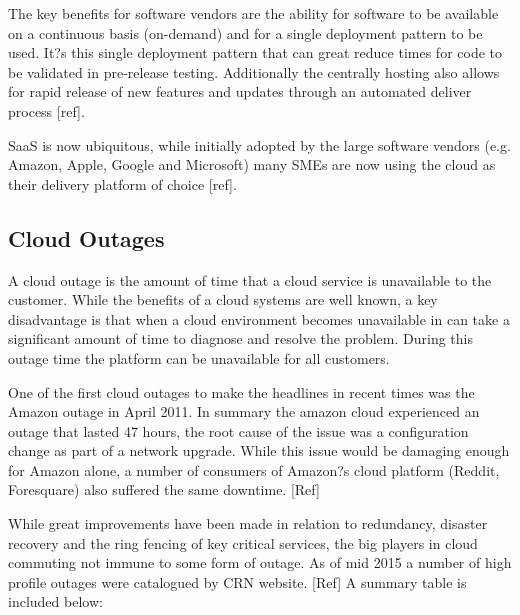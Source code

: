 \documentclass[conference]{IEEEtran}
\begin{document}
The key benefits for software vendors are the ability for software to be available on a continuous basis (on-demand) and for a single deployment pattern to be used. It?s this single deployment pattern that can great reduce times for code to be validated in pre-release testing. Additionally the centrally hosting also allows for rapid release of new features and updates through an automated deliver process [ref]. \par
SaaS is now ubiquitous, while initially adopted by the large software vendors (e.g. Amazon, Apple, Google and Microsoft) many SMEs are now using the cloud as their delivery platform of choice [ref]. \par

\subsection{Cloud Outages}
A cloud outage is the amount of time that a cloud service is unavailable to the customer. While the benefits of a cloud systems are well known, a key disadvantage is that when a cloud environment becomes unavailable in can take a significant amount of time to diagnose and resolve the problem. During this outage time the platform can be unavailable for all customers. \par

One of the first cloud outages to make the headlines in recent times was the Amazon outage in April 2011.  In summary the amazon cloud experienced an outage that lasted 47 hours, the root cause of the issue was a configuration change as part of a network upgrade. While this issue would be damaging enough for Amazon alone, a number of consumers of Amazon?s cloud platform (Reddit, Foresquare) also suffered the same downtime. [Ref] \par

While great improvements have been made in relation to redundancy, disaster recovery and the ring fencing of key critical services, the big players in cloud commuting not immune to some form of outage. As of mid 2015 a number of high profile outages were catalogued by CRN website. [Ref] A summary table is included below: \par
\end{document}
